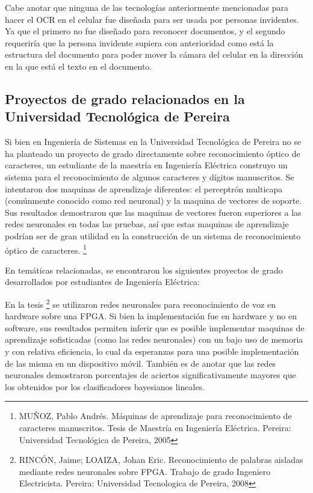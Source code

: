 \documentclass[a4paper, 11pt, oneside]{report}
\begin{document}
Cabe anotar que ninguna de las tecnologías anteriormente mencionadas para hacer el OCR en el celular fue diseñada para ser usada por personas invidentes. Ya que el primero no fue diseñado para reconocer documentos, y el segundo requeriría que la persona invidente supiera con anterioridad como está la estructura del documento para poder mover la cámara del celular en la dirección en la que está el texto en el documento.
	
\subsection{Proyectos de grado relacionados en la Universidad Tecnológica de Pereira}

Si bien en Ingeniería de Sistemas en la Universidad Tecnológica de Pereira no se ha planteado un proyecto de grado directamente sobre reconocimiento óptico de caracteres, un estudiante de la maestría en Ingeniería Eléctrica construyo un sistema para el reconocimiento de algunos caracteres y dígitos manuscritos. Se intentaron dos maquinas de aprendizaje diferentes: el perceptrón multicapa (comúnmente conocido como red neuronal) y la maquina de vectores de soporte. Sus resultados demostraron que las maquinas de vectores fueron superiores a las redes neuronales en todas las pruebas, así que estas maquinas de aprendizaje podrían ser de gran utilidad en la construcción de un sistema de reconocimiento óptico de caracteres. \footnote{MUÑOZ, Pablo Andrés. Máquinas de aprendizaje para reconocimiento de caracteres manuscritos. Tesis de Maestría en Ingeniería Eléctrica. Pereira: Universidad Tecnológica de Pereira, 2005}

En temáticas relacionadas, se encontraron los siguientes proyectos de grado desarrollados por estudiantes de Ingeniería Eléctrica:
    
En la tesis \footnote{RINCÓN, Jaime; LOAIZA, Johan Eric. Reconocimiento de palabras aisladas mediante redes neuronales sobre FPGA. Trabajo de grado Ingeniero Electricista. Pereira: Universidad Tecnologica de Pereira, 2008} se utilizaron redes neuronales para reconocimiento de voz en hardware sobre una FPGA. Si bien la implementación fue en hardware y no en software, sus resultados permiten inferir que es posible implementar maquinas de aprendizaje sofisticadas (como las redes neuronales) con un bajo uso de memoria y con relativa eficiencia, lo cual da esperanzas para una posible implementación de las misma en un dispositivo móvil. También es de anotar que las redes neuronales demostraron porcentajes de aciertos significativamente mayores que los obtenidos por los clasificadores bayesianos lineales.
\end{document}
